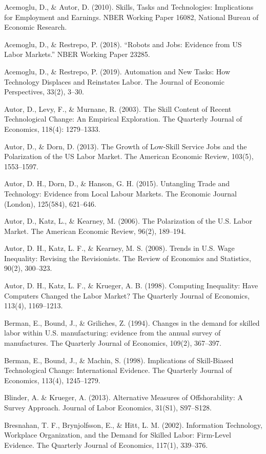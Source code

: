 \documentclass[undefended]{bumrp}
\begin{document}
\begin{hangparas}{.25in}{1}

Acemoglu, D., \& Autor, D. (2010). Skills, Tasks and Technologies: Implications for Employment and Earnings. NBER Working Paper 16082, National Bureau of Economic Research.

Acemoglu, D., \& Restrepo, P. (2018). “Robots and Jobs: Evidence from US Labor Markets.” NBER Working Paper 23285.

Acemoglu, D., \& Restrepo, P. (2019). Automation and New Tasks: How Technology Displaces and Reinstates Labor. The Journal of Economic Perspectives, 33(2), 3–30. 

Autor, D., Levy, F.,  \& Murnane, R. (2003). The Skill Content of Recent Technological Change: An Empirical Exploration. The Quarterly Journal of Economics, 118(4): 1279–1333.

Autor, D.,  \& Dorn, D. (2013). The Growth of Low-Skill Service Jobs and the Polarization of the US Labor Market. The American Economic Review, 103(5), 1553–1597. 

Autor, D. H., Dorn, D.,  \& Hanson, G. H. (2015). Untangling Trade and Technology: Evidence from Local Labour Markets. The Economic Journal (London), 125(584), 621–646.

Autor, D., Katz, L.,  \& Kearney, M. (2006). The Polarization of the U.S. Labor Market. The American Economic Review, 96(2), 189–194. 

Autor, D. H., Katz, L. F.,  \& Kearney, M. S. (2008). Trends in U.S. Wage Inequality: Revising the Revisionists. The Review of Economics and Statistics, 90(2), 300–323.

Autor, D. H., Katz, L. F., \& Krueger, A. B. (1998). Computing Inequality: Have Computers Changed the Labor Market? The Quarterly Journal of Economics, 113(4), 1169–1213.

Berman, E., Bound, J.,  \& Griliches, Z. (1994). Changes in the demand for skilled labor within U.S. manufacturing: evidence from the annual survey of manufactures. The Quarterly Journal of Economics, 109(2), 367–397.

Berman, E., Bound, J.,  \& Machin, S. (1998). Implications of Skill-Biased Technological Change: International Evidence. The Quarterly Journal of Economics, 113(4), 1245–1279.

Blinder, A.  \& Krueger, A. (2013). Alternative Measures of Offshorability: A Survey Approach. Journal of Labor Economics, 31(S1), S97–S128.

Bresnahan, T. F., Brynjolfsson, E.,  \& Hitt, L. M. (2002). Information Technology, Workplace Organization, and the Demand for Skilled Labor: Firm-Level Evidence. The Quarterly Journal of Economics, 117(1), 339–376.


\end{hangparas}
\end{document}
